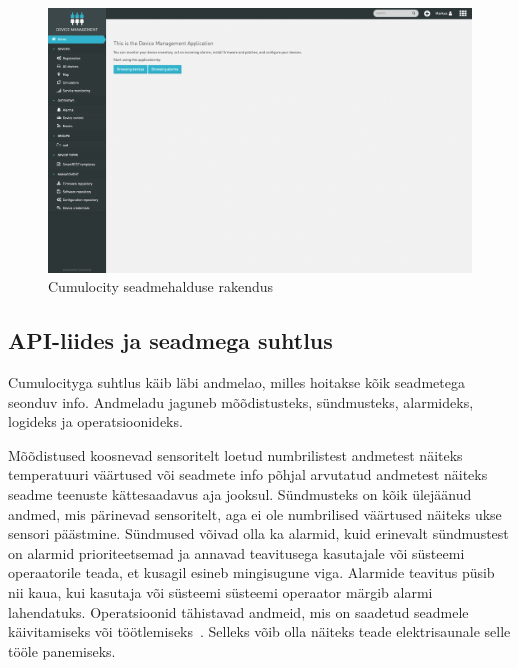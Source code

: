 \documentclass[12pt]{article}
\begin{document}
  \begin{figure} [ht] %
  \begin{center}
  \includegraphics[width=1\textwidth]{cumulocityDeviceManagement}
  \caption{Cumulocity seadmehalduse rakendus}
  \label{fig:cumulocityDeviceManagement}
  \end{center}
  \end{figure}
  
  \FloatBarrier


  \subsection{API-liides ja seadmega suhtlus}

  Cumulocityga suhtlus käib läbi andmelao, milles hoitakse kõik seadmetega seonduv info. Andmeladu jaguneb
  mõõdistusteks, sündmusteks, alarmideks, logideks ja operatsioonideks.
  
  Mõõdistused koosnevad sensoritelt loetud
  numbrilistest andmetest näiteks temperatuuri väärtused või seadmete info põhjal arvutatud andmetest näiteks
  seadme teenuste kättesaadavus aja jooksul. Sündmusteks on kõik ülejäänud andmed, mis pärinevad sensoritelt,
  aga ei ole numbrilised väärtused näiteks ukse sensori päästmine. Sündmused võivad olla ka alarmid, kuid
  erinevalt sündmustest on alarmid prioriteetsemad ja annavad teavitusega kasutajale või süsteemi operaatorile
  teada, et kusagil esineb mingisugune viga. Alarmide teavitus püsib nii kaua, kui kasutaja või süsteemi
  süsteemi operaator märgib alarmi lahendatuks. Operatsioonid
  tähistavad andmeid, mis on saadetud seadmele käivitamiseks või töötlemiseks~\cite{CumulocityConceptsDomainModel}.
  Selleks võib olla näiteks teade elektrisaunale selle tööle panemiseks.
\end{document}
